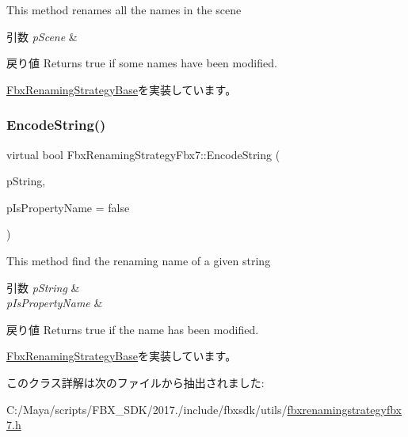 This method renames all the names in the scene 
\begin{DoxyParams}{引数}
{\em p\+Scene} & \\
\hline
\end{DoxyParams}
\begin{DoxyReturn}{戻り値}
Returns true if some names have been modified. 
\end{DoxyReturn}


\hyperlink{class_fbx_renaming_strategy_base_a7449fa6c649949d6d5e3c4b7190d6b25}{Fbx\+Renaming\+Strategy\+Base}を実装しています。

\mbox{\label{class_fbx_renaming_strategy_fbx7_ae7ce3bfd32c1cb7c8ac420972287760e}} 
\subsubsection{\texorpdfstring{Encode\+String()}{EncodeString()}}
{\footnotesize\ttfamily virtual bool Fbx\+Renaming\+Strategy\+Fbx7\+::\+Encode\+String (\begin{DoxyParamCaption}\item[{\hyperlink{class_fbx_name_handler}{Fbx\+Name\+Handler} \&}]{p\+String,  }\item[{bool}]{p\+Is\+Property\+Name = {\ttfamily false} }\end{DoxyParamCaption})\hspace{0.3cm}{\ttfamily [virtual]}}

This method find the renaming name of a given string 
\begin{DoxyParams}{引数}
{\em p\+String} & \\
\hline
{\em p\+Is\+Property\+Name} & \\
\hline
\end{DoxyParams}
\begin{DoxyReturn}{戻り値}
Returns true if the name has been modified. 
\end{DoxyReturn}


\hyperlink{class_fbx_renaming_strategy_base_aa762726a9d92a328ec720f2b8135db09}{Fbx\+Renaming\+Strategy\+Base}を実装しています。



このクラス詳解は次のファイルから抽出されました\+:\begin{DoxyCompactItemize}
\item 
C\+:/\+Maya/scripts/\+F\+B\+X\+\_\+\+S\+D\+K/2017./include/fbxsdk/utils/\hyperlink{fbxrenamingstrategyfbx7_8h}{fbxrenamingstrategyfbx7.\+h}\end{DoxyCompactItemize}
